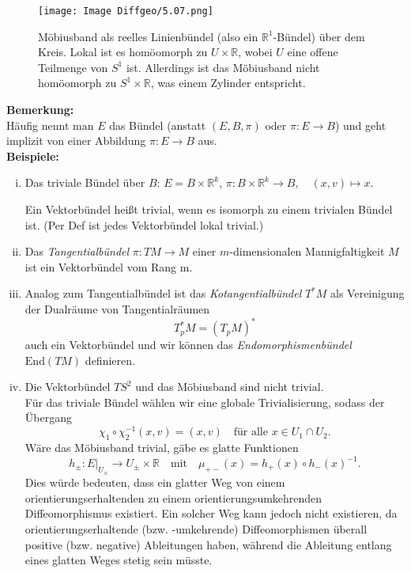 \documentclass[fleqn, 12pt, letterpaper]{article}
\begin{document}
\begin{figure}[H]
  \centering
  \texttt{[image: Image Diffgeo/5.07.png]}
\caption{Möbiusband als reelles Linienbündel (also ein $\mathbb{R}^1$-Bündel) über dem Kreis. Lokal ist es homöomorph zu \(U \times \mathbb{R}\), wobei \(U\) eine offene Teilmenge von \(S^1\) ist. Allerdings ist das Möbiusband nicht homöomorph zu \(S^1 \times \mathbb{R}\), was einem Zylinder entspricht.
}
\end{figure}

\textbf{Bemerkung:} \\
Häufig nennt man \(E\) das Bündel (anstatt \((E, B, \pi)\) oder \(\pi: E \to B\)) und geht implizit von einer Abbildung \(\pi: E \to B\) aus.\\

\textbf{Beispiele:}
\begin{enumerate}[i)]
    \item Das triviale Bündel über \(B\): \(E = B \times \mathbb{R}^k\), \quad \(\pi: B \times \mathbb{R}^k \to B,\quad (x,v) \mapsto x.\)

    Ein Vektorbündel heißt trivial, wenn es isomorph zu einem trivialen Bündel ist. (Per Def ist jedes Vektorbündel lokal trivial.)

    \vspace{1em}

    \item Das \emph{Tangentialbündel} \(\pi: TM \to M\) einer \(m\)-dimensionalen Mannigfaltigkeit \(M\) ist ein Vektorbündel vom Rang m.

    \vspace{1em}

    \item Analog zum Tangentialbündel ist das \emph{Kotangentialbündel} \(T^*M\) als Vereinigung der Dualräume von Tangentialräumen
    \[
    T_p^* M = (T_p M)^*
    \]
    auch ein Vektorbündel und wir können das \emph{Endomorphismenbündel} \(\mathrm{End}(TM)\) definieren.

    \vspace{1em}

    \item Die Vektorbündel $TS^2$ und das Möbiusband sind nicht trivial.\\
    Für das triviale Bündel wählen wir eine globale Trivialisierung, sodass der Übergang
\[
\chi_1 \circ \chi_2^{-1}(x,v) = (x,v) \quad \text{für alle } x \in U_1 \cap U_2.
\]
Wäre das Möbiusband trivial, gäbe es glatte Funktionen 
\[
h_\pm : E|_{U_\pm} \to U_{\pm}\times \mathbb{R}\quad \text{mit} \quad \mu_{+-}(x) = h_+(x) \circ h_-(x)^{-1}.
\]
Dies würde bedeuten, dass ein glatter Weg von einem orientierungserhaltenden zu einem orientierungsumkehrenden Diffeomorphismus existiert. Ein solcher Weg kann jedoch nicht existieren, da orientierungserhaltende (bzw. -umkehrende) Diffeomorphismen überall positive (bzw. negative) Ableitungen haben, während die Ableitung entlang eines glatten Weges stetig sein müsste.



\end{enumerate}
\end{document}
